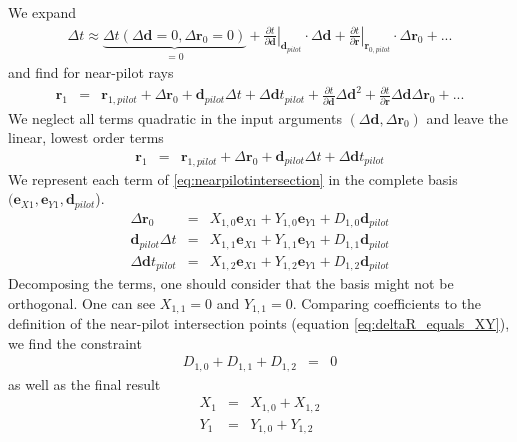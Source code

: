 \documentclass[12pt,a4paper,twoside,openright,BCOR10mm,headsepline,titlepage,abstracton,chapterprefix,final]{scrreprt}
\newcommand\Vector[1]{{\mathbf{#1}}}
\begin{document}
We expand
\begin{eqnarray}
 \Delta t \approx 
    \underbrace{
      \Delta t(\Delta\Vector{d} = 0, \Delta\Vector{r}_0 = 0)
    }_{=0}
    + \left. \frac{\partial t}{\partial\Vector{d}} \right|_{\Vector{d}_{pilot}}  \cdot \Delta\Vector{d} 
    + \left. \frac{\partial t}{\partial\Vector{r}} \right|_{\Vector{r}_{0,pilot}} \cdot \Delta\Vector{r}_0 
    + ...
    \label{eq:delta_t}
\end{eqnarray}
and find for near-pilot rays
\begin{eqnarray}
 \Vector{r}_1 &=& \Vector{r}_{1,pilot} + \Delta\Vector{r}_0 + \Vector{d}_{pilot}\Delta t + \Delta\Vector{d}t_{pilot} 
      + \frac{\partial t}{\partial\Vector{d}} \Delta\Vector{d}^2 
      + \frac{\partial t}{\partial\Vector{r}} \Delta\Vector{d} \Delta\Vector{r}_0 + ...
\end{eqnarray} 
We neglect all terms quadratic in the input arguments $(\Delta\Vector{d}, \Delta\Vector{r}_0)$
and leave the linear, lowest order terms
\begin{eqnarray}
 \Vector{r}_1 &=& \Vector{r}_{1,pilot} + \Delta\Vector{r}_0 + \Vector{d}_{pilot}\Delta t + \Delta\Vector{d}t_{pilot}
 \label{eq:nearpilotintersection}
\end{eqnarray} 
We represent each term of \ref{eq:nearpilotintersection} in the complete basis $(\Vector{e}_{X1}, \Vector{e}_{Y1}, \Vector{d}_{pilot}$).
\begin{eqnarray}
 \Delta\Vector{r}_0 &=& X_{1,0} \Vector{e}_{X1} + Y_{1,0} \Vector{e}_{Y1} + D_{1,0} \Vector{d}_{pilot} \\
 \Vector{d}_{pilot}\Delta t &=& X_{1,1} \Vector{e}_{X1} + Y_{1,1} \Vector{e}_{Y1} + D_{1,1} \Vector{d}_{pilot} \\
 \Delta\Vector{d}t_{pilot} &=& X_{1,2} \Vector{e}_{X1} + Y_{1,2} \Vector{e}_{Y1} + D_{1,2} \Vector{d}_{pilot} 
\end{eqnarray}
Decomposing the terms, one should consider that the basis might not be orthogonal.
One can see $X_{1,1} = 0$ and $Y_{1,1}=0$.
Comparing coefficients to the definition of the near-pilot intersection points (equation \ref{eq:deltaR_equals_XY}), 
we find the constraint
\begin{eqnarray}
 D_{1,0} + D_{1,1} + D_{1,2} &=& 0
\end{eqnarray}
as well as the final result
\begin{eqnarray}
 X_1 &=& X_{1,0} + X_{1,2} \\
 Y_1 &=& Y_{1,0} + Y_{1,2}
\end{eqnarray}
\end{document}
